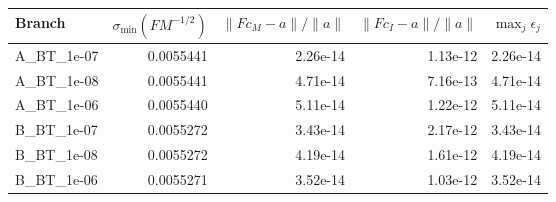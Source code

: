 \begin{tabular}{lrrrr}
\hline\hline
Branch & $\sigma_{\min}(FM^{-1/2})$ & $\|Fc_M-a\|/\|a\|$ & $\|Fc_I-a\|/\|a\|$ & $\max_j\epsilon_j$ \\
\hline
A\_BT\_1e-07 & 0.0055441 & 2.26e-14 & 1.13e-12 & 2.26e-14 \\
A\_BT\_1e-08 & 0.0055441 & 4.71e-14 & 7.16e-13 & 4.71e-14 \\
A\_BT\_1e-06 & 0.0055440 & 5.11e-14 & 1.22e-12 & 5.11e-14 \\
B\_BT\_1e-07 & 0.0055272 & 3.43e-14 & 2.17e-12 & 3.43e-14 \\
B\_BT\_1e-08 & 0.0055272 & 4.19e-14 & 1.61e-12 & 4.19e-14 \\
B\_BT\_1e-06 & 0.0055271 & 3.52e-14 & 1.03e-12 & 3.52e-14 \\
\hline\hline
\end{tabular}
